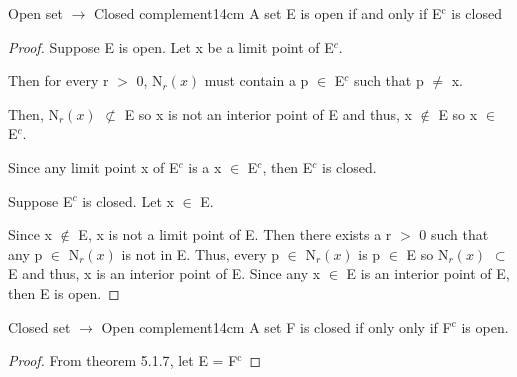 	\newpage



	\begin{wtheorem}{Open set $\rightarrow$ Closed complement}{14cm}
		A set E is open if and only if E$^\text{c}$ is closed
	\end{wtheorem}
	
	\begin{proof}
		Suppose E is open. Let x be a limit point of E$^c$.

		Then for every r $>$ 0, N$_r(x)$ must contain a p $\in$ E$^c$
		such that p $\neq$ x.

		Then, N$_r(x)$ $\not \subset$ E so x is not an interior point of E and
		thus, x $\not \in$ E so x $\in$ E$^c$.

		Since any limit point x of E$^c$ is a x $\in$ E$^c$, then E$^c$ is closed.

		\vspace{0.2cm}

		Suppose E$^c$ is closed. Let x $\in$ E.

		Since x $\not \in$ E, x is not a limit point of E.
		Then there exists a r $>$ 0 such that any p $\in$ N$_r(x)$ is not in E.
		Thus, every p $\in$ N$_r(x)$ is p $\in$ E so N$_r(x)$ $\subset$ E and thus,
		x is an interior point of E.
		Since any x $\in$ E is an interior point of E, then E is open.
	\end{proof}

	\vspace{0.5cm}



	\begin{corollary}{Closed set $\rightarrow$ Open complement}{14cm}
		A set F is closed if only only if F$^\text{c}$ is open.
	\end{corollary}
	
	\begin{proof}
		From {\color{red} theorem 5.1.7}, let E = F$^\text{c}$
	\end{proof}

	\vspace{0.5cm}



